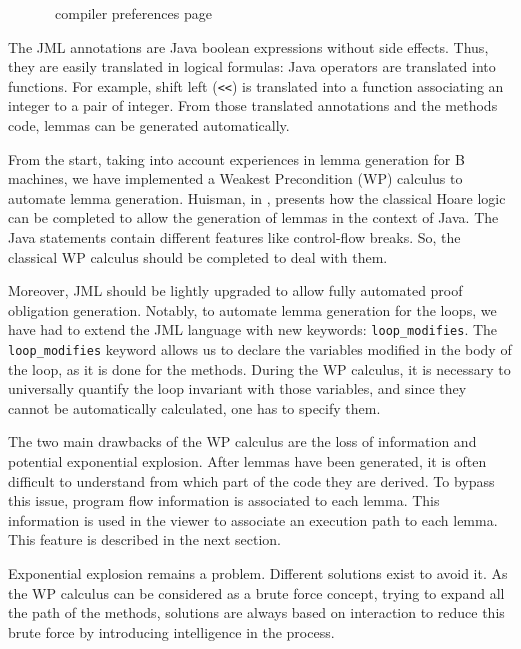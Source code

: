 \begin{figure}[p]
 \caption{\sc \JACK\ compiler preferences page}
 \label{JACKcompprefpage}
\end{figure}
 The JML annotations are Java boolean expressions without side
 effects.  Thus, they are easily translated in logical formulas: Java operators are
 translated into functions. For example, shift left (\texttt{<<}) is
 translated into a function associating an integer to a pair of
 integer.  From those translated annotations and the methods code,
 lemmas can be generated automatically.

 From the start, taking into account
 experiences in lemma generation for B machines, we have implemented a Weakest Precondition (WP) calculus to automate lemma
 generation.  Huisman, in \cite{Huisman:PhD}, presents how the
 classical Hoare logic can be completed to allow the generation of
 lemmas in the context of Java.  The Java statements contain different
 features like control-flow breaks.  So, the classical WP calculus
 should be completed to deal with them.

 Moreover, JML should be lightly upgraded to allow fully automated proof obligation generation.
 Notably, to
 automate lemma generation for the loops, we have had to extend
 the JML language with new keywords: \texttt{loop\_modifies}.
 The \texttt{loop\_modifies} keyword allows us to declare the variables modified in
the body of the loop, as it is done for the methods. During the WP calculus, it is necessary to universally
quantify the loop invariant with those variables, and since they cannot be automatically calculated, one has to
specify them.
 
 The two main drawbacks of the WP calculus are the loss of information and
 potential exponential explosion.  After lemmas have been generated,
 it is often difficult to understand from which part of the code they
 are derived.  To bypass this issue, program flow information is
 associated to each lemma.  This information is used in the viewer
 to associate an execution path to each lemma. This feature is described in the next section.

 Exponential explosion remains a problem.  Different solutions exist
 to avoid it.  As the WP calculus can be considered as a brute
 force concept, trying to expand all the path of the methods,
 solutions are always based on interaction to reduce this brute force
 by introducing intelligence in the process.

